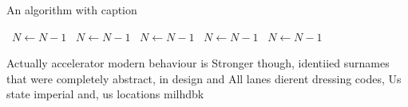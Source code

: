 \documentclass[a4paper]{article}
\begin{document}
\begin{algorithm}
\caption{An algorithm with caption}
\begin{algorithmic}
\    \State $N \gets N - 1$
\    \State $N \gets N - 1$
\    \State $N \gets N - 1$
\    \State $N \gets N - 1$
\    \State $N \gets N - 1$
\EndWhile
\end{algorithmic}
\end{algorithm}

Actually accelerator modern behaviour is Stronger though, identiied surnames that were completely abstract, in design and All lanes dierent dressing codes, Us state imperial and, us locations milhdbk
\end{document}
